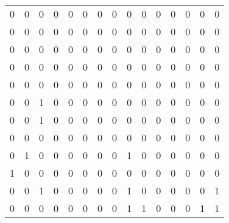 \begin{table}[!ht]
\begin{tabular}{lllllllllllllll}
        0 & 0 & 0 & 0 & 0 & 0 & 0 & 0 & 0 & 0 & 0 & 0 & 0 & 0 & 0 \\ 
        0 & 0 & 0 & 0 & 0 & 0 & 0 & 0 & 0 & 0 & 0 & 0 & 0 & 0 & 0 \\ 
        0 & 0 & 0 & 0 & 0 & 0 & 0 & 0 & 0 & 0 & 0 & 0 & 0 & 0 & 0 \\ 
        0 & 0 & 0 & 0 & 0 & 0 & 0 & 0 & 0 & 0 & 0 & 0 & 0 & 0 & 0 \\ 
        0 & 0 & 0 & 0 & 0 & 0 & 0 & 0 & 0 & 0 & 0 & 0 & 0 & 0 & 0 \\ 
        0 & 0 & 1 & 0 & 0 & 0 & 0 & 0 & 0 & 0 & 0 & 0 & 0 & 0 & 0 \\ 
        0 & 0 & 1 & 0 & 0 & 0 & 0 & 0 & 0 & 0 & 0 & 0 & 0 & 0 & 0 \\ 
        0 & 0 & 0 & 0 & 0 & 0 & 0 & 0 & 0 & 0 & 0 & 0 & 0 & 0 & 0 \\ 
        0 & 1 & 0 & 0 & 0 & 0 & 0 & 0 & 1 & 0 & 0 & 0 & 0 & 0 & 0 \\ 
        1 & 0 & 0 & 0 & 0 & 0 & 0 & 0 & 0 & 0 & 0 & 0 & 0 & 0 & 0 \\ 
        0 & 0 & 1 & 0 & 0 & 0 & 0 & 0 & 1 & 0 & 0 & 0 & 0 & 0 & 1 \\ 
        0 & 0 & 0 & 0 & 0 & 0 & 0 & 0 & 1 & 1 & 0 & 0 & 0 & 1 & 1 \\ 
    \end{tabular}
\end{table}

